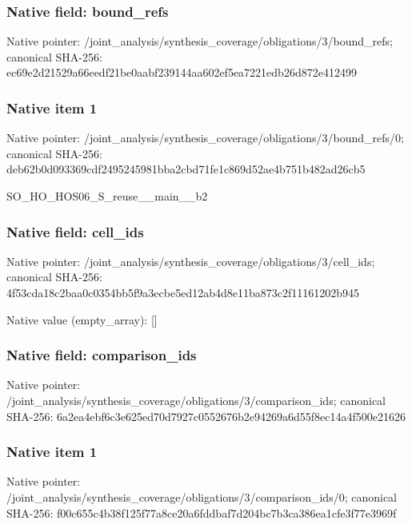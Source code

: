 \documentclass[10pt,a4paper]{article}
\begin{document}
\subsubsection{Native field: bound\_\allowbreak{}refs}
Native pointer: /joint\_\allowbreak{}analysis/synthesis\_\allowbreak{}coverage/obligations/3/bound\_\allowbreak{}refs; canonical SHA-256: ec69e2d21529a66eedf21be0aabf239144aa602ef5ea7221edb26d872e412499

\subsubsection{Native item 1}
Native pointer: /joint\_\allowbreak{}analysis/synthesis\_\allowbreak{}coverage/obligations/3/bound\_\allowbreak{}refs/0; canonical SHA-256: deb62b0d093369cdf2495245981bba2cbd71fe1c869d52ae4b751b482ad26cb5

\begingroup\raggedright\sloppy SO\_\allowbreak{}HO\_\allowbreak{}HOS06\_\allowbreak{}S\_\allowbreak{}reuse\_\allowbreak{}\_\allowbreak{}main\_\allowbreak{}\_\allowbreak{}b2\par\endgroup

\subsubsection{Native field: cell\_\allowbreak{}ids}
Native pointer: /joint\_\allowbreak{}analysis/synthesis\_\allowbreak{}coverage/obligations/3/cell\_\allowbreak{}ids; canonical SHA-256: 4f53cda18c2baa0c0354bb5f9a3ecbe5ed12ab4d8e11ba873c2f11161202b945

Native value (empty\_\allowbreak{}array): []

\subsubsection{Native field: comparison\_\allowbreak{}ids}
Native pointer: /joint\_\allowbreak{}analysis/synthesis\_\allowbreak{}coverage/obligations/3/comparison\_\allowbreak{}ids; canonical SHA-256: 6a2ea4ebf6c3e625ed70d7927c0552676b2e94269a6d55f8ec14a4f500e21626

\subsubsection{Native item 1}
Native pointer: /joint\_\allowbreak{}analysis/synthesis\_\allowbreak{}coverage/obligations/3/comparison\_\allowbreak{}ids/0; canonical SHA-256: f00c655c4b38f125f77a8ce20a6fddbaf7d204bc7b3ca386ea1cfe3f77e3969f
\end{document}
